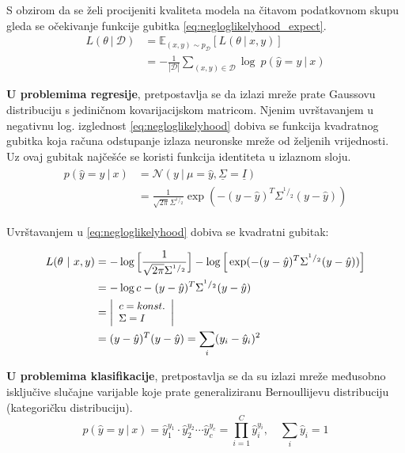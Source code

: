 \documentclass[times, utf8, numeric, diplomski]{fer}
\def\mat#1{\underline{#1}}
\def\expect{\mathbb{E}}
\def\normal{\mathcal{N}}
\def\probsep{\ |\ }
\def\dataset{\mathcal{D}}
\begin{document}
S obzirom da se želi procijeniti kvaliteta modela na čitavom podatkovnom skupu gleda se očekivanje funkcije gubitka \eqref{eq:negloglikelyhood_expect}.
\begin{equation}
\label{eq:negloglikelyhood_expect}
\begin{split}
L(\theta \probsep \dataset) &= \expect_{(x,y) \sim p_\dataset}[L(\theta \probsep x,y)] \\
&= -\frac{1}{|\dataset|} \sum_{(x,y)\in\dataset} \log\ p(\hat{y}=y \probsep x)
\end{split}
\end{equation}

\textbf{U problemima regresije}, pretpostavlja se da izlazi mreže prate Gaussovu distribuciju s jediničnom kovarijacijskom matricom. Njenim uvrštavanjem u negativnu log. izglednost \eqref{eq:negloglikelyhood} dobiva se funkcija kvadratnog gubitka koja računa odstupanje izlaza neuronske mreže od željenih vrijednosti. Uz ovaj gubitak najčešće se koristi funkcija identiteta u izlaznom sloju.
\begin{align}
\label{eq:normal_dist}
\begin{split}
p(\hat{y}=y \probsep x) &= \normal(y \probsep \mu=\hat{y}, \mat{\Sigma}=\mat{I}) \\
&= \frac{1}{\sqrt{2\pi}\Sigma^{^1/_2}} \exp(-(y-\hat{y})^T\Sigma^{^1/_2}(y-\hat{y}))
\end{split}
\end{align}

Uvrštavanjem u \eqref{eq:negloglikelyhood} dobiva se kvadratni gubitak:

\begin{align}
\label{eq:loss_regression}
L(\theta \probsep x,y) &= - \log \Big[ \frac{1}{\sqrt{2\pi}\Sigma^{^1/_2}} \Big] - \log \Big[ \exp(-(y-\hat{y})^T\Sigma^{^1/_2}(y-\hat{y})) \Big] \nonumber \\
&= -\log c - (y-\hat{y})^T\Sigma^{^1/_2}(y-\hat{y}) \nonumber \\
&= \left|\footnotesize 
\begin{array}[c]{l} 
	c = konst. \\ 
	\Sigma = I 
\end{array}
\right| \nonumber \\
&= (y-\hat{y})^T(y-\hat{y}) = \sum_i (y_i - \hat{y}_i)^2
\end{align}

\textbf{U problemima klasifikacije}, pretpostavlja se da su izlazi mreže međusobno isključive slučajne varijable koje prate generaliziranu Bernoullijevu distribuciju (kategoričku distribuciju).
\begin{equation}
p(\hat{y}=y \probsep x) = \hat{y}_1^{y_1} \cdot \hat{y}_2^{y_2} \cdots \hat{y}_c^{y_c} 
= \prod_{i=1}^C \hat{y}_i^{y_i}, \quad \sum_i \hat{y}_i = 1
\end{equation}
\end{document}

